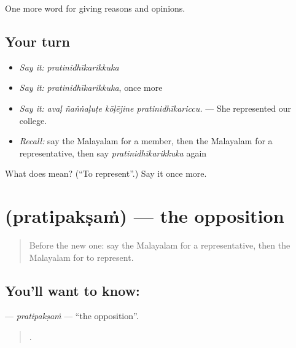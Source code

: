 \begin{grammarlens}[title={What you've built}]
One more word for giving reasons and opinions.
\end{grammarlens}

\subsection*{Your turn}
\begin{itemize}
\raggedright
  \item \emph{Say it:} \emph{pratinidhīkarikkuka}
  \item \emph{Say it:} \emph{pratinidhīkarikkuka}, once more
  \item \emph{Say it:} \emph{avaḷ ñaṅṅaḷuṭe kōḷējine pratinidhīkariccu.} — She represented our college.
  \item \emph{Recall:} say the Malayalam for a member, then the Malayalam for a representative, then say \emph{pratinidhīkarikkuka} again
\end{itemize}

\begin{tcolorbox}[breakable,colback=teal!4,colframe=teal!35!black,title={Before you move on}]
What does  mean? (\textquotedblleft{}To represent\textquotedblright{}.) Say it once more.
\end{tcolorbox}
\section[\texorpdfstring{\ml{പ്രതിപക്ഷം} (pratipakṣaṁ)}{പ്രതിപക്ഷം (pratipakṣaṁ)}]{ (pratipakṣaṁ) — the opposition}

\label{lesson:ML-C422-pratipaksam}



\begin{quote}
Before the new one: say the Malayalam for a representative, then the Malayalam for to represent.
\end{quote}

\subsection*{You'll want to know: }
\textbf{} — \emph{pratipakṣaṁ} — \textquotedblleft{}the opposition\textquotedblright{}.

\begin{quote}
   .
\end{quote}

